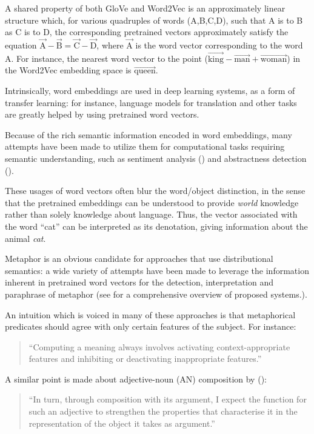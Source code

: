 \documentclass[10pt,letterpaper,twocolumn]{article}
\begin{document}
A shared property of both GloVe and Word2Vec is an approximately linear structure which, for various quadruples of words (A,B,C,D), such that A is to B as C is to D, the corresponding pretrained vectors approximately satisfy the equation $\overrightarrow{\text{A}} - \overrightarrow{\text{B}} = \overrightarrow{\text{C}} - \overrightarrow{\text{D}}$, where $\overrightarrow{\text{A}}$ is the word vector corresponding to the word A. For instance, the nearest word vector to the point ($\overrightarrow{\text{king}}-\overrightarrow{\text{man}}+\overrightarrow{\text{woman}}$) in the Word2Vec embedding space is $\overrightarrow{\text{queen}}$.

Intrinsically, word embeddings are used in deep learning systems, as a form of transfer learning: for instance, language models for translation and other tasks are greatly helped by using pretrained word vectors.


Because of the rich semantic information encoded in word embeddings, many attempts have been made to utilize them for computational tasks requiring semantic understanding, such as sentiment analysis (\cite{socher2013recursive}) and abstractness detection (\cite{turney}).

These usages of word vectors often blur the word/object distinction, in the sense that the pretrained embeddings can be understood to provide \emph{world} knowledge rather than solely knowledge about language. Thus, the vector associated with the word ``cat'' can be interpreted as its denotation, giving information about the animal \emph{cat}.

Metaphor is an obvious candidate for approaches that use distributional semantics: a wide variety of attempts have been made to leverage the information inherent in pretrained word vectors for the detection, interpretation and paraphrase of metaphor (see \cite{shutova2016design} for a comprehensive overview of proposed systems.).

An intuition which is voiced in many of these approaches is that metaphorical predicates should agree with only certain features of the subject. For instance:
\begin{quote}	``Computing a meaning always involves activating context-appropriate features and inhibiting or deactivating
			inappropriate features.'' \cite{kintsch}
\end{quote}

A similar point is made about adjective-noun (AN) composition by (\cite{grefenstette2013category}): \begin{quote} ``In turn, through composition with its argument, I expect the function for such an adjective to strengthen the properties that characterise it in the representation of the object it takes as argument.''
\end{quote}
\end{document}
